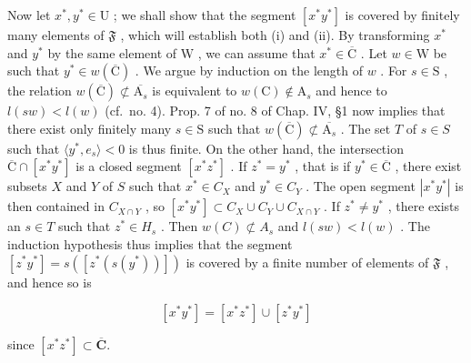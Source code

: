 Now let \(x^{*}, y^{*} \in \mathrm{U}\) ; we shall show that the segment \([x^{*}y^{*}]\) is covered by finitely many elements of \(\mathfrak{F}\) , which will establish both (i) and (ii). By transforming \(x^{*}\) and \(y^{*}\) by the same element of \(\mathrm{W}\) , we can assume that \(x^{*} \in \overline{\mathrm{C}}\) . Let \(w \in \mathrm{W}\) be such that \(y^{*} \in w(\overline{\mathrm{C}})\) . We argue by induction on the length of \(w\) . For \(s \in \mathrm{S}\) , the relation \(w(\overline{\mathrm{C}}) \not\subset \overline{\mathrm{A}_{s}}\) is equivalent to \(w(\mathrm{C}) \notin \mathrm{A}_{s}\) and hence to \(l(sw) < l(w)\) (cf.~no. 4). Prop. 7 of no. 8 of Chap. IV, §1 now implies that there exist only finitely many \(s \in \mathrm{S}\) such that \(w(\overline{\mathrm{C}}) \not\subset \overline{\mathrm{A}_{s}}\) . The set \(T\) of \(s \in S\) such that \(\langle y^{*}, e_{s} \rangle < 0\) is thus finite. On the other hand, the intersection \(\overline{\mathrm{C}} \cap [x^{*}y^{*}]\) is a closed segment \([x^{*}z^{*}]\) . If \(z^{*} = y^{*}\) , that is if \(y^{*} \in \overline{\mathrm{C}}\) , there exist subsets \(X\) and \(Y\) of \(S\) such that \(x^{*} \in C_{X}\) and \(y^{*} \in C_{Y}\) . The open segment \(|x^{*}y^{*}|\) is then contained in \(C_{X \cap Y}\) , so \([x^{*}y^{*}] \subset C_{X} \cup C_{Y} \cup C_{X \cap Y}\) . If \(z^{*} \neq y^{*}\) , there exists an \(s \in T\) such that \(z^{*} \in H_{s}\) . Then \(w(C) \not\subset A_{s}\) and \(l(sw) < l(w)\) . The induction hypothesis thus implies that the segment \([z^{*}y^{*}] = s([z^{*}(s(y^{*}))])\) is covered by a finite number of elements of \(\mathfrak{F}\) , and hence so is

\[
\left[ x ^ {*} y ^ {*} \right] = \left[ x ^ {*} z ^ {*} \right] \cup \left[ z ^ {*} y ^ {*} \right]
\]

since \([x^{*}z^{*}]\subset \overline{\mathbf{C}}.\)

